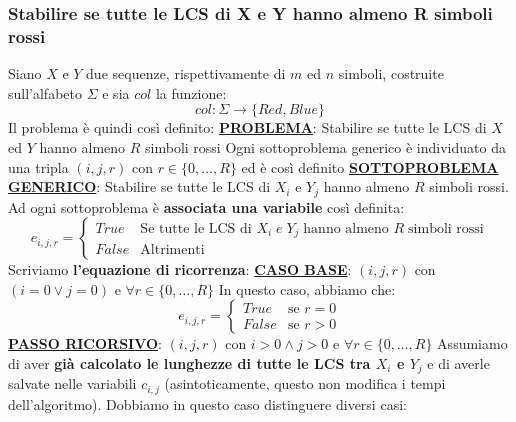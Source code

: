 \documentclass[12pt]{article}
\begin{document}
\subsubsection{Stabilire se tutte le LCS di X e Y hanno almeno R simboli rossi}
Siano $X$ e $Y$ due sequenze, rispettivamente di $m$ ed $n$ simboli, costruite sull'alfabeto $\Sigma$ e sia $col$ la funzione:
$$col: \Sigma \rightarrow \{Red, Blue\}$$
Il problema è quindi così definito: \newline
\textbf{\underline{PROBLEMA}}: Stabilire se tutte le LCS di $X$ ed $Y$ hanno almeno $R$ simboli rossi \newline
Ogni sottoproblema generico è individuato da una tripla $(i,j,r)$ con $r \in \{0,\dots, R\}$ ed è così definito \newline
\textbf{\underline{SOTTOPROBLEMA GENERICO}}: Stabilire se tutte le LCS di $X_i$ e $Y_j$ hanno almeno $R$ simboli rossi. \newline
Ad ogni sottoproblema è \textbf{associata una variabile} così definita:
\begin{equation*}
    e_{i,j,r} = \begin{cases}
        True & \textrm{Se tutte le LCS di } X_i \; e \; Y_j \; \textrm{hanno almeno } R \; \textrm{simboli rossi} \\
        False & \textrm{Altrimenti}
    \end{cases}
\end{equation*}
Scriviamo \textbf{l'equazione di ricorrenza}: \newline
\textbf{\underline{CASO BASE}}: $(i,j,r)$ con $(i = 0 \vee j = 0)$ e $\forall r \in \{0,\dots, R\}$ \newline
In questo caso, abbiamo che:
\begin{equation*}
    e_{i,j,r} = \begin{cases}
        True & \textrm{se } r = 0 \\
        False & \textrm{se } r > 0
    \end{cases}
\end{equation*}
\textbf{\underline{PASSO RICORSIVO}}: $(i,j,r)$ con $i > 0 \land j > 0$ e $\forall r \in \{0,\dots,R\}$ \newline
Assumiamo di aver \textbf{già calcolato le lunghezze di tutte le LCS tra $X_i$ e $Y_j$} e di averle salvate nelle variabili $c_{i,j}$ (asintoticamente, questo non modifica i tempi dell'algoritmo).
Dobbiamo in questo caso distinguere diversi casi:
\end{document}
